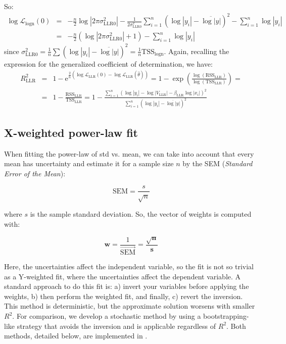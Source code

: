 So:
\begin{eqnarray*}
\log\mathcal{L}_\text{logn}(0) &=& -\frac{n}{2}\log\left|2\pi\sigma^2_\text{LLR0}\right| - \frac{1}{2\sigma^2_\text{LLR0}}\sum_{i=1}^n\left(\log|y_i|-\overline{\log|y|}\right)^2 - \sum_{i=1}^n\log|y_i|\\
 &=& -\frac{n}{2}\left(\log\left|2\pi\sigma^2_\text{LLR0}\right| + 1 \right) - \sum_{i=1}^n\log|y_i|
\end{eqnarray*}
since $\sigma^2_\text{LLR0}=\frac{1}{n}\sum\left(\log|y_i|-\overline{\log|y|}\right)^2=\frac{1}{n}\mathrm{TSS}_\text{logn}$. Again, recalling the expression for the generalized coefficient of determination, we have:
\begin{eqnarray*}
R^2_\text{LLR} &=& 1 - \mathrm{e}^{\frac{2}{n}\left(\log\mathcal{L}_\text{LLR}(0)-\log\mathcal{L}_\text{LLR}(\hat\theta)\right)} = 1 - \exp{\left(\frac{\log(\mathrm{RSS}_\text{LLR})}{\log(\mathrm{TSS}_\text{LLR})}\right)}
 =\\ &=& 1 - \frac{\mathrm{RSS}_\text{LLR}}{\mathrm{TSS}_\text{LLR}} =
 1 - \frac{\sum_{i=1}^n\left(\log|y_i|-\log|V_\text{LLR}|-\beta_\text{LLR}\log|x_i|\right)^2}{\sum_{i=1}^n\left(\log|y_i|-\overline{\log|y|}\right)^2}
\end{eqnarray*}


\subsection*{X-weighted power-law fit}\label{sec:X-w}

When fitting the power-law of std vs. mean, we can take into account that every mean has uncertainty and estimate it for a sample size $n$ by the SEM (\emph{Standard Error of the Mean}):
\begin{linenomath}
$$ \mathrm{SEM} = \frac{s}{\sqrt{n}}$$
\end{linenomath}
where $s$ is the sample standard deviation. So, the vector of weights is computed with:
\begin{linenomath}
$$ \mathbf{w} = \frac{1}{\overrightarrow{\mathrm{SEM}}} = \frac{\sqrt{\mathbf{n}}}{\mathbf{s}}$$
\end{linenomath}

Here, the uncertainties affect the independent variable, so the fit is not so trivial as a Y-weighted fit, where the uncertainties affect the dependent variable. A standard approach to do this fit is: a) invert your variables before applying the weights, b) then perform the weighted fit, and finally, c) revert the inversion. This method is deterministic, but the approximate solution worsens with smaller $R^2$. For comparison, we develop a stochastic method by using a bootstrapping-like strategy that avoids the inversion and is applicable regardless of $R^2$. Both methods, detailed below, are implemented in \CC.

